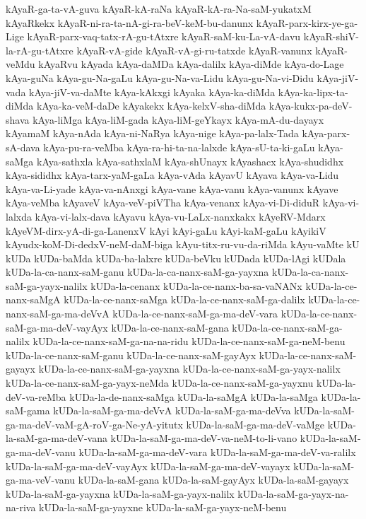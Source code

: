 {kAyaR-ga-ta-vA-guva
kAyaR-kA-raNa
kAyaR-kA-ra-Na-saM-yukatxM
kAyaRkekx
kAyaR-ni-ra-ta-nA-gi-ra-beV-keM-bu-danunx
kAyaR-parx-kirx-ye-ga-Lige
kAyaR-parx-vaq-tatx-rA-gu-tAtxre
kAyaR-saM-ku-La-vA-davu
kAyaR-shiV-la-rA-gu-tAtxre
kAyaR-vA-gide
kAyaR-vA-gi-ru-tatxde
kAyaR-vanunx
kAyaR-veMdu
kAyaRvu
kAyada
kAya-daMDa
kAya-dalilx
kAya-diMde
kAya-do-Lage
kAya-guNa
kAya-gu-Na-gaLu
kAya-gu-Na-va-Lidu
kAya-gu-Na-vi-Didu
kAya-jiV-vada
kAya-jiV-va-daMte
kAya-kAkxgi
kAyaka
kAya-ka-diMda
kAya-ka-lipx-ta-diMda
kAya-ka-veM-daDe
kAyakekx
kAya-kelxV-sha-diMda
kAya-kukx-pa-deV-shava
kAya-liMga
kAya-liM-gada
kAya-liM-geYkayx
kAya-mA-du-dayayx
kAyamaM
kAya-nAda
kAya-ni-NaRya
kAya-nige
kAya-pa-lalx-Tada
kAya-parx-sA-dava
kAya-pu-ra-veMba
kAya-ra-hi-ta-na-lalxde
kAya-sU-ta-ki-gaLu
kAya-saMga
kAya-sathxla
kAya-sathxlaM
kAya-shUnayx
kAyashacx
kAya-shudidhx
kAya-sididhx
kAya-tarx-yaM-gaLa
kAya-vAda
kAyavU
kAyava
kAya-va-Lidu
kAya-va-Li-yade
kAya-va-nAnxgi
kAya-vane
kAya-vanu
kAya-vanunx
kAyave
kAya-veMba
kAyaveV
kAya-veV-piVTha
kAya-venanx
kAya-vi-Di-diduR
kAya-vi-lalxda
kAya-vi-lalx-dava
kAyavu
kAya-vu-LaLx-nanxkakx
kAyeRV-Mdarx
kAyeVM-dirx-yA-di-ga-LanenxV
kAyi
kAyi-gaLu
kAyi-kaM-gaLu
kAyikiV
kAyudx-koM-Di-dedxV-neM-daM-biga
kAyu-titx-ru-vu-da-riMda
kAyu-vaMte
kU
kUDa
kUDa-baMda
kUDa-ba-lalxre
kUDa-beVku
kUDada
kUDa-lAgi
kUDala
kUDa-la-ca-nanx-saM-ganu
kUDa-la-ca-nanx-saM-ga-yayxna
kUDa-la-ca-nanx-saM-ga-yayx-nalilx
kUDa-la-cenanx
kUDa-la-ce-nanx-ba-sa-vaNANx
kUDa-la-ce-nanx-saMgA
kUDa-la-ce-nanx-saMga
kUDa-la-ce-nanx-saM-ga-dalilx
kUDa-la-ce-nanx-saM-ga-ma-deVvA
kUDa-la-ce-nanx-saM-ga-ma-deV-vara
kUDa-la-ce-nanx-saM-ga-ma-deV-vayAyx
kUDa-la-ce-nanx-saM-gana
kUDa-la-ce-nanx-saM-ga-nalilx
kUDa-la-ce-nanx-saM-ga-na-na-ridu
kUDa-la-ce-nanx-saM-ga-neM-benu
kUDa-la-ce-nanx-saM-ganu
kUDa-la-ce-nanx-saM-gayAyx
kUDa-la-ce-nanx-saM-gayayx
kUDa-la-ce-nanx-saM-ga-yayxna
kUDa-la-ce-nanx-saM-ga-yayx-nalilx
kUDa-la-ce-nanx-saM-ga-yayx-neMda
kUDa-la-ce-nanx-saM-ga-yayxnu
kUDa-la-deV-va-reMba
kUDa-la-de-nanx-saMga
kUDa-la-saMgA
kUDa-la-saMga
kUDa-la-saM-gama
kUDa-la-saM-ga-ma-deVvA
kUDa-la-saM-ga-ma-deVva
kUDa-la-saM-ga-ma-deV-vaM-gA-roV-ga-Ne-yA-yitutx
kUDa-la-saM-ga-ma-deV-vaMge
kUDa-la-saM-ga-ma-deV-vana
kUDa-la-saM-ga-ma-deV-va-neM-to-li-vano
kUDa-la-saM-ga-ma-deV-vanu
kUDa-la-saM-ga-ma-deV-vara
kUDa-la-saM-ga-ma-deV-va-ralilx
kUDa-la-saM-ga-ma-deV-vayAyx
kUDa-la-saM-ga-ma-deV-vayayx
kUDa-la-saM-ga-ma-veV-vanu
kUDa-la-saM-gana
kUDa-la-saM-gayAyx
kUDa-la-saM-gayayx
kUDa-la-saM-ga-yayxna
kUDa-la-saM-ga-yayx-nalilx
kUDa-la-saM-ga-yayx-na-na-riva
kUDa-la-saM-ga-yayxne
kUDa-la-saM-ga-yayx-neM-benu
}
